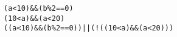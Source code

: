 \begin{footnotesize}
\begin{verbatim}
(a<10)&&(b%2==0)
(10<a)&&(a<20)
((a<10)&&(b%2==0))||(!((10<a)&&(a<20)))
\end{verbatim}
\end{footnotesize}

